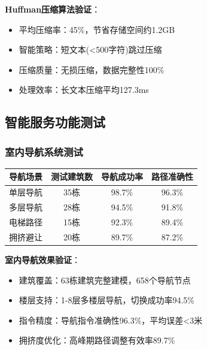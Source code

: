 \documentclass[12pt,a4paper]{article}
\begin{document}
\textbf{Huffman压缩算法验证}：
\begin{itemize}
    \item 平均压缩率：45\%，节省存储空间约1.2GB
    \item 智能策略：短文本(<500字符)跳过压缩
    \item 压缩质量：无损压缩，数据完整性100\%
    \item 处理效率：长文本压缩平均127.3ms
\end{itemize}

\subsection{智能服务功能测试}

\subsubsection{室内导航系统测试}

\begin{table}[H]
\centering
\begin{tcolorbox}[
    colback=light,
    colframe=success,
    title={\textbf{室内导航测试结果}},
    coltitle=white,
    colbacktitle=success,
    fonttitle=\bfseries,
    rounded corners=5pt,
    width=0.95\textwidth
]
\begin{tabular}{lccc}
\toprule
\rowcolor{success!20}
\textbf{导航场景} & \textbf{测试建筑数} & \textbf{导航成功率} & \textbf{路径准确性} \\
\midrule
单层导航 & 35栋 & 98.7\% & 96.3\% \\
\rowcolor{light}
多层导航 & 28栋 & 94.5\% & 91.8\% \\
电梯路径 & 15栋 & 92.3\% & 89.4\% \\
\rowcolor{light}
拥挤避让 & 20栋 & 89.7\% & 87.2\% \\
\bottomrule
\end{tabular}
\end{tcolorbox}
\end{table}

\textbf{室内导航效果验证}：
\begin{itemize}
    \item 建筑覆盖：63栋建筑完整建模，658个导航节点
    \item 楼层支持：1-8层多楼层导航，切换成功率94.5\%
    \item 指令精度：导航指令准确性96.3\%，平均误差<3米
    \item 拥挤度优化：高峰期路径调整有效率89.7\%
\end{itemize}
\end{document}
